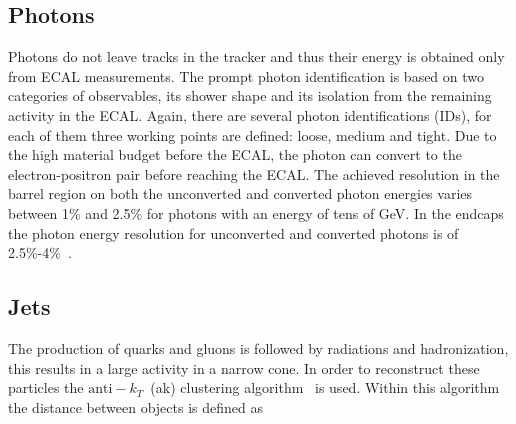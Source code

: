 

\subsection{Photons}

Photons do not leave tracks in the tracker and thus their energy is obtained only from ECAL measurements. The prompt photon identification is based on two categories of observables, its shower shape and its isolation from the remaining activity in the ECAL. Again, there are several photon identifications (IDs), for each of them three working points are defined: loose, medium and tight. Due to the high material budget before the ECAL, the photon can convert to the electron-positron pair before reaching the ECAL. The achieved resolution in the barrel region  on both the unconverted and converted photon energies varies between 1\% and 2.5\% for photons with an energy of tens of GeV. In the endcaps the photon energy resolution for unconverted and converted photons is of 2.5\%-4\%~\cite{CMS:EGM-14-001}.

\subsection{Jets}

The production of quarks and gluons is followed by radiations and hadronization, this results in a large activity in a narrow cone. In order to reconstruct these particles the $\mathrm{anti-}k_{T}$~(ak) clustering algorithm~\cite{Cacciari:2008gp, Cacciari:2011ma} is used. Within this algorithm the distance between objects is defined as

